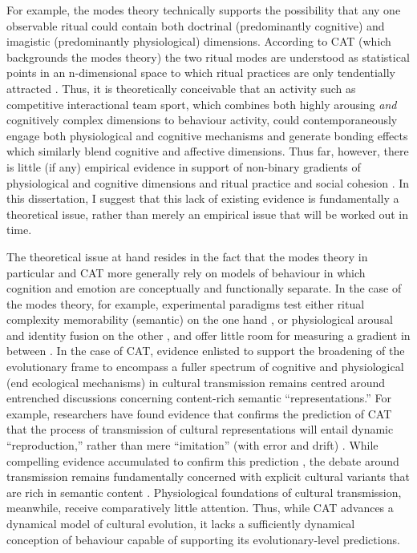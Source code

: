 \begin{CJK}{UTF8}{gbsn}
For example, the modes theory technically supports the possibility that any one observable ritual could contain both doctrinal (predominantly cognitive) and imagistic (predominantly physiological) dimensions.  According to CAT (which backgrounds the modes theory) the two ritual modes are understood as statistical points in an n-dimensional space to which ritual practices are only tendentially attracted \citep{Scott-Phillips2017}.  Thus, it is theoretically conceivable that an activity such as competitive interactional team sport, which combines both highly arousing \textit{and} cognitively complex dimensions to behaviour activity,  could contemporaneously engage both physiological and cognitive mechanisms and generate bonding effects which similarly blend cognitive and affective dimensions.   Thus far, however, there is little (if any) empirical evidence in support of non-binary gradients of physiological and cognitive dimensions and ritual practice and social cohesion \citep[but see][]{Atran2010,Russell2014}.  In this dissertation, I suggest that this lack of existing evidence is fundamentally a theoretical issue, rather than merely an empirical issue that will be worked out in time.  

The theoretical issue at hand resides in the fact that the modes theory in particular and CAT more generally rely on models of behaviour in which cognition and emotion are conceptually and functionally separate.  In the case of the modes theory, for example, experimental paradigms test either ritual complexity memorability (semantic) on the one hand \citep{Whitehouse2005}, or physiological arousal and identity fusion on the other \citep{Whitehouse2014,Whitehouse2017,Swann2010a,Richert2005}, and offer little room for measuring a gradient in between \citep[but see][]{Russell2014}.  In the case of CAT, evidence enlisted to support the broadening of the evolutionary frame to encompass a fuller spectrum of cognitive and physiological (end ecological mechanisms) in cultural transmission remains centred around entrenched discussions concerning content-rich semantic ``representations.''  For example, researchers have found evidence that confirms the prediction of CAT that the process of transmission of cultural representations will entail dynamic ``reproduction,'' rather than mere ``imitation'' (with error and drift) \citep{Mesoudi2017}.  While compelling evidence accumulated to confirm this prediction \citep{Morin2016,Scott-Phillips2017a,Lerique2016}, the debate around transmission remains fundamentally concerned with explicit cultural variants that are rich in semantic content \citep[e.g. language, literature, and concrete cultural artefacts, see][]{Ramstead2016}. Physiological foundations of cultural transmission, meanwhile, receive comparatively little attention.  Thus, while CAT advances a dynamical model of cultural evolution, it lacks a sufficiently dynamical conception of behaviour capable of supporting its evolutionary-level predictions.


\end{CJK}

